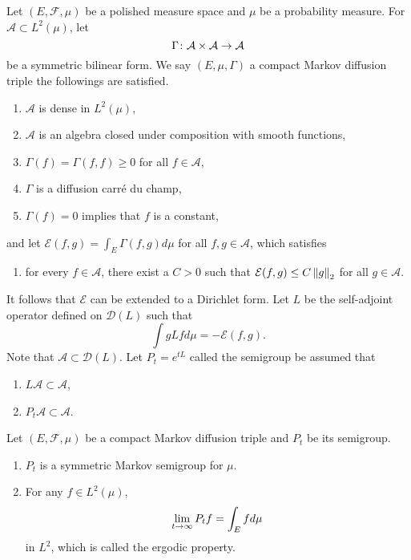 \begin{defn}
    Let $(E,\mathcal{F},\mu)$ be a polished measure space and $\mu$ be a probability measure. For $\mathcal{A} \subset L^2(\mu)$, let
    \begin{equation*}
    	\Gamma \colon \mathcal{A} \times \mathcal{A} \rightarrow \mathcal{A}
    \end{equation*}
    be a symmetric bilinear form. We say $(E,\mu,\Gamma)$ a compact Markov diffusion triple the followings are satisfied.
    \begin{enumerate}[label=(\alph*),series=myalph1]
    	\item $\mathcal{A}$ is dense in $L^2(\mu)$,
    	\item $\mathcal{A}$ is an algebra closed under composition with smooth functions,
    	\item $\Gamma(f) = \Gamma(f,f) \geq 0$ for all $f \in \mathcal{A}$,
    	\item $\Gamma$ is a diffusion carr\'e du champ,
    	\item $\Gamma(f) = 0$ implies that $f$ is a constant,
    \end{enumerate}
    and let $\mathcal{E}(f,g) = \int_E \Gamma(f,g)d\mu$ for all $f,g \in \mathcal{A}$, which satisfies
    \begin{enumerate}[label=(\alph*), resume=myalph1]
    	\item for every $f \in \mathcal{A}$, there exist a $C > 0$ such that $\mathcal{E}(f,g) \leq C\left\lVert g\right\lVert_2$ for all $g \in \mathcal{A}$.
    \end{enumerate}
    It follows that $\mathcal{E}$ can be extended to a Dirichlet form. Let $L$ be the self-adjoint operator defined on $\mathcal{D}(L)$ such that
    \begin{equation*}
    	\int g L f d \mu=-\mathcal{E}(f, g).
    \end{equation*}
    Note that $\mathcal{A} \subset \mathcal{D}(L)$. Let $P_t = e^{tL}$ called the semigroup be assumed that
    \begin{enumerate}[label=(\alph*),resume=myalph1]
    	\item $L\mathcal{A} \subset \mathcal{A}$,
    	\item $P_t \mathcal{A} \subset \mathcal{A}$.
    \end{enumerate}
\end{defn}

\begin{prop}
    Let $(E,\mathcal{F},\mu)$ be a compact Markov diffusion triple and $P_t$ be its semigroup.
    \begin{enumerate}[label=(\arabic{*})]
    	\item $P_t$ is a symmetric Markov semigroup for $\mu$.
    	\item For any $f \in L^2(\mu)$,
    	\begin{equation*}
    		\lim_{t \rightarrow \infty}P_tf = \int_E fd\mu
    	\end{equation*}
    	in $L^2$, which is called the ergodic property.
    \end{enumerate}
\end{prop}

